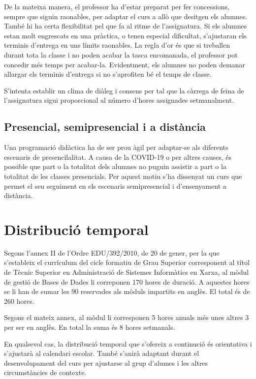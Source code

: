 \documentclass[catalan, a4paper, 12pt, titlepage]{article}
\begin{document}
De la mateixa manera, el professor ha d'estar preparat per fer concessions, sempre que siguin raonables, per adaptar el curs a allò que desitgen els alumnes.
També hi ha certa flexibilitat pel que fa al ritme de l'assignatura. 
Si els alumnes estan molt engrescats en una pràctica, o tenen especial dificultat, s'ajustaran els terminis d'entrega en uns límits raonables.
La regla d'or és que si treballen durant tota la classe i no poden acabar la tasca encomanada, el professor pot concedir més temps per acabar-la.
Evidentment, els alumnes no poden demanar allargar els terminis d'entrega si no s'aprofiten bé el temps de classe.

S'intenta establir un clima de diàleg i consens per tal que la càrrega de feina de l'assignatura sigui proporcional al número d'hores assignades setmanalment.

\subsection{Presencial, semipresencial i a distància}

Una programació didàctica ha de ser prou àgil per adaptar-se als diferents escenaris de presencilalitat.
A causa de la COVID-19 o per altres causes, és possible que part o la totalitat dels alumnes no puguin assistir a part o la totalitat de les classes presencials.
Per aquest motiu s'ha dissenyat un curs que permet el seu seguiment en els escenaris semipresencial i d'ensenyament a distància.

\section{Distribució temporal}

Segons l'annex II de l'Ordre EDU/392/2010, de 20 de gener, per la que s'estableix el currículum del cicle formatiu de Grau Superior corresponent al títol de Tècnic Superior en Administració de Sistemes Informàtics en Xarxa, al mòdul de gestió de Bases de Dades li correponen 170 hores de duració. A aquestes hores se li han de sumar les 90 reservades als mòduls impartits en anglès. El total és de 260 hores.

Segons el mateix annex, al mòdul li corresponen 5 hores anuals més unes altres 3 per ser en anglès. En total la suma és 8 hores setmanals.

En qualsevol cas, la distribució temporal que s'ofereix a continució és orientativa i s'ajustarà al calendari escolar. També s'anirà adaptant durant el desenvolupament del curs per ajustarse al grup d'alumes i les altres circumstàncies de contexte.
\end{document}
